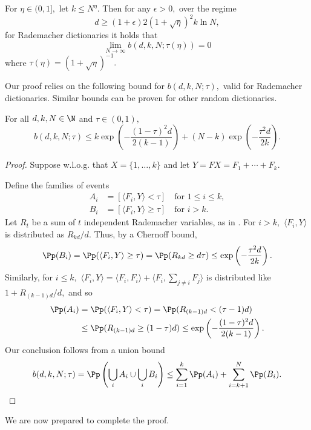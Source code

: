\begin{proposition*}
	For $\eta \in (0, 1],$ let $k \le N^\eta.$ Then for any $\epsilon > 0,$ over the regime
	$$
	d \ge (1 + \epsilon) 2(1 + \sqrt \eta)^2 k \ln N,
	$$
	for Rademacher dictionaries it holds that
	$$
	\lim_{N \to \infty} b(d, k, N; \tau(\eta)) = 0
	$$
	where $\tau(\eta) = (1 + \sqrt \eta)^{-1}.$
\end{proposition*}

Our proof relies on the following bound for $b(d, k, N; \tau),$ valid for Rademacher dictionaries. Similar bounds can be proven for other random dictionaries.

\begin{lemma}\label{lemma:b-bound}
For all $d, k, N \in \N$ and $\tau \in (0, 1),$
$$
b(d, k, N; \tau) \le
k \exp\left( - \frac{(1 - \tau)^2 d}{2 (k-1)} \right) + (N - k) \exp\left( - \frac{\tau^2 d} {2 k} \right).
$$
\end{lemma}

\begin{proof}
Suppose w.l.o.g. that $X = \{1, \dots, k\}$ and let $Y = FX = F_1 + \cdots + F_k.$

Define the families of events
\begin{align*}
    A_i &= [\langle F_i, Y \rangle < \tau] \quad \text{for } 1 \le i \le k, \\
    B_i &= [\langle F_i, Y \rangle \ge \tau] \quad \text{for } i > k.
\end{align*}
Let $R_t$ be a sum of $t$ independent Rademacher variables, as in . For $i > k,$ $\langle F_i, Y \rangle$ is distributed as $R_{kd}/d.$ Thus, by a Chernoff bound,
$$
\Pp(B_i) = \Pp(\langle F_i, Y \rangle \ge \tau) = \Pp(R_{kd} \ge d\tau) \le \exp\left(-\frac{\tau^2 d}{2k}\right).
$$
Similarly, for $i \le k,$ $\langle F_i, Y \rangle = \langle F_i, F_i \rangle + \langle F_i, \sum_{j \neq i} F_j \rangle$ is distributed like $1 + R_{(k-1)d}/d,$ and so
\begin{align*}
\Pp(A_i) &= \Pp(\langle F_i, Y \rangle < \tau) = \Pp(R_{(k-1)d} < (\tau - 1)d)\\
&\le \Pp(R_{(k-1)d} \ge (1-\tau)d) \le \exp\left(-\frac{(1-\tau)^2 d}{2(k - 1)}\right).
\end{align*}
Our conclusion follows from a union bound
$$
b(d, k, N; \tau) = \Pp\left( \bigcup_i A_i \cup \bigcup_i B_i \right) \le \sum_{i=1}^k \Pp(A_i) + \sum_{i=k+1}^N \Pp(B_i).
$$
\end{proof}

We are now prepared to complete the proof.

